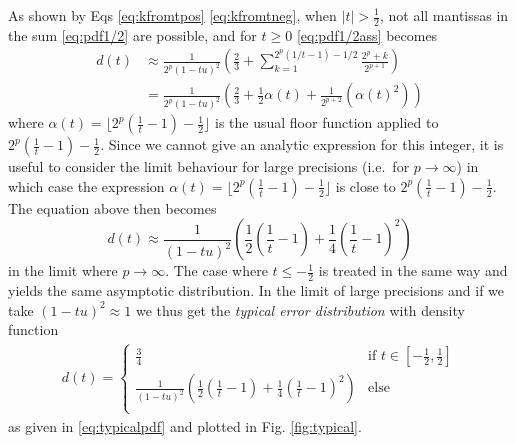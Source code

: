 \documentclass[10pt,conference]{IEEEtran}
\newcommand{\ie}{i.e.\ }
\newcommand{\floor}[1]{\lfloor #1 \rfloor}
\newcommand{\absv}[1]{\vert #1\vert}
\begin{document}
As shown by Eqs \eqref{eq:kfromtpos} \eqref{eq:kfromtneg}, when $\absv{t}>\frac{1}{2}$, not all mantissas in the sum \eqref{eq:pdf1/2} are possible, and for $t\geq 0$ \eqref{eq:pdf1/2ass} becomes 
\begin{align*}
d(t)&\approx\frac{1}{2^p(1-tu)^2}\left(\frac{2}{3}+\sum_{k=1}^{2^p(1/t-1)-1/2}\frac{2^p+k}{2^{p+1}}\right)
\\
&=\frac{1}{2^p(1-tu)^2}\left(\frac{2}{3}+\frac{1}{2}\alpha(t)+\frac{1}{2^{p+2}}(\alpha(t)^2)\right)
\end{align*}
where $\alpha(t)=\floor{2^p(\frac{1}{t}-1)-\frac{1}{2}}$ is the usual floor function applied to $2^p(\frac{1}{t}-1)-\frac{1}{2}$. Since we cannot give an analytic expression for this integer, it is useful to consider the limit behaviour for large precisions (\ie for $p\to\infty$) in which case the expression $\alpha(t)=\floor{2^p(\frac{1}{t}-1)-\frac{1}{2}}$ is close to $2^p(\frac{1}{t}-1)-\frac{1}{2}$. The equation above then becomes
\[
d(t)\approx\frac{1}{(1-tu)^2}\left(\frac{1}{2}\left(\frac{1}{t}-1\right)+\frac{1}{4}\left(\frac{1}{t}-1\right)^2\right)
\]
in the limit where $p\to\infty$. The case where $t\leq -\frac{1}{2}$ is treated in the same way and yields the same asymptotic distribution. In the limit of large precisions and if we take $(1-tu)^2\approx 1$ we thus get the \emph{typical error distribution} with density function 
\begin{align*}
d(t)=\begin{cases}
\frac{3}{4}&\text{if }t\in\left[-\frac{1}{2} ,\frac{1}{2}\right]  \\
\frac{1}{(1-tu)^2}\left(\frac{1}{2}\left(\frac{1}{t}-1\right)+\frac{1}{4}\left(\frac{1}{t}-1\right)^2\right) & \text{else }\\
\end{cases}
\end{align*}
as given in \cref{eq:typicalpdf} and plotted in Fig. \ref{fig:typical}.
\end{document}
